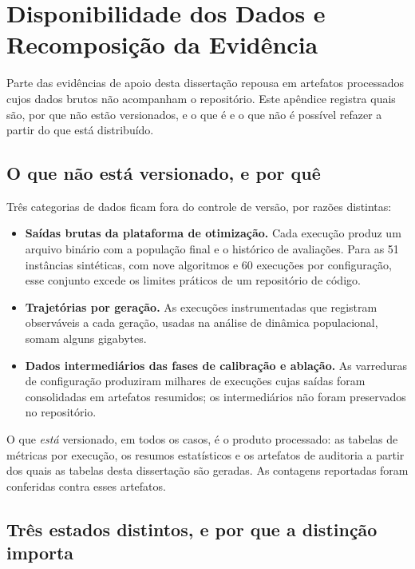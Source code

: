 \chapter{Disponibilidade dos Dados e Recomposição da Evidência}
\label{apend:recuperacao}

Parte das evidências de apoio desta dissertação repousa em artefatos processados cujos dados brutos não acompanham o repositório. Este apêndice registra quais são, por que não estão versionados, e o que é e o que não é possível refazer a partir do que está distribuído.

\section{O que não está versionado, e por quê}

Três categorias de dados ficam fora do controle de versão, por razões distintas:

\begin{itemize}
\item \textbf{Saídas brutas da plataforma de otimização.} Cada execução produz um arquivo binário com a população final e o histórico de avaliações. Para as 51 instâncias sintéticas, com nove algoritmos e 60 execuções por configuração, esse conjunto excede os limites práticos de um repositório de código.

\item \textbf{Trajetórias por geração.} As execuções instrumentadas que registram observáveis a cada geração, usadas na análise de dinâmica populacional, somam alguns gigabytes.

\item \textbf{Dados intermediários das fases de calibração e ablação.} As varreduras de configuração produziram milhares de execuções cujas saídas foram consolidadas em artefatos resumidos; os intermediários não foram preservados no repositório.
\end{itemize}

O que \emph{está} versionado, em todos os casos, é o produto processado: as tabelas de métricas por execução, os resumos estatísticos e os artefatos de auditoria a partir dos quais as tabelas desta dissertação são geradas. As contagens reportadas foram conferidas contra esses artefatos.

\section{Três estados distintos, e por que a distinção importa}

